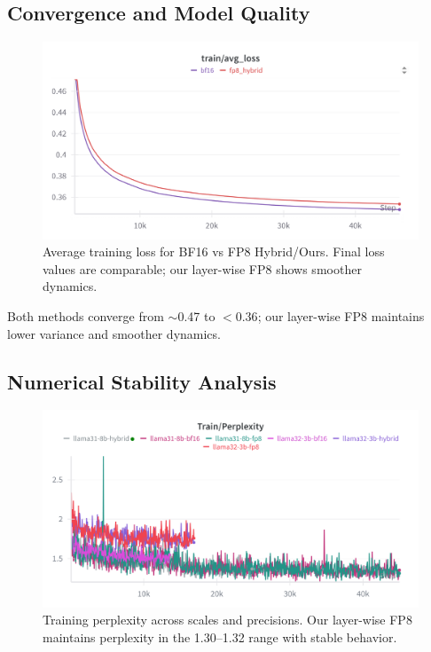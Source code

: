 \documentclass[conference]{IEEEtran}
\begin{document}
\subsection{Convergence and Model Quality}
\begin{figure}[htbp]
    \centering
    \includegraphics[width=1\columnwidth]{avg_loss.png}
    \caption{Average training loss for BF16 vs FP8 Hybrid/Ours. Final loss values are comparable; our layer-wise FP8 shows smoother dynamics.}
    \label{fig:training_loss}
\end{figure}

Both methods converge from $\sim$0.47 to $<0.36$; our layer-wise FP8 maintains lower variance and smoother dynamics.

\subsection{Numerical Stability Analysis}
\begin{figure}[htbp]
    \centering
    \includegraphics[width=1\columnwidth]{train_perplexity.png}
    \caption{Training perplexity across scales and precisions. Our layer-wise FP8 maintains perplexity in the 1.30–1.32 range with stable behavior.}
    \label{fig:perplexity_analysis}
\end{figure}
\end{document}
